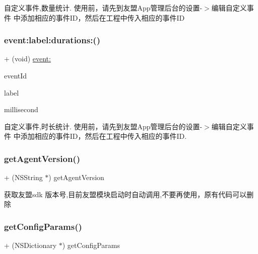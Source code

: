 自定义事件,数量统计. 使用前，请先到友盟\+App管理后台的设置-\/$>$编辑自定义事件 中添加相应的事件\+I\+D，然后在工程中传入相应的事件\+ID \mbox{\label{interfaceMobClick_a190a123c20da553d3719ceefd00fd619}} 
\subsubsection{\texorpdfstring{event\+:label\+:durations\+:()}{event:label:durations:()}}
{\footnotesize\ttfamily + (void) \hyperlink{interfaceMobClick_a1e1c48199935a97e0d96562627821641}{event\+:} \begin{DoxyParamCaption}\item[{(N\+S\+String $\ast$)}]{event\+Id }\item[{label:(N\+S\+String $\ast$)}]{label }\item[{durations:(int)}]{millisecond }\end{DoxyParamCaption}}

自定义事件,时长统计. 使用前，请先到友盟\+App管理后台的设置-\/$>$编辑自定义事件 中添加相应的事件\+I\+D，然后在工程中传入相应的事件\+ID. \mbox{\label{interfaceMobClick_a8f2f2903913ccbc5a2ee49d6c2b0b6e3}} 
\subsubsection{\texorpdfstring{get\+Agent\+Version()}{getAgentVersion()}}
{\footnotesize\ttfamily + (N\+S\+String $\ast$) get\+Agent\+Version \begin{DoxyParamCaption}{ }\end{DoxyParamCaption}}

获取友盟sdk 版本号,目前友盟模块启动时自动调用,不要再使用，原有代码可以删除 \mbox{\label{interfaceMobClick_acb35b949d01928173c62c3c4d9e53dcb}} 
\subsubsection{\texorpdfstring{get\+Config\+Params()}{getConfigParams()}}
{\footnotesize\ttfamily + (N\+S\+Dictionary $\ast$) get\+Config\+Params \begin{DoxyParamCaption}{ }\end{DoxyParamCaption}}


